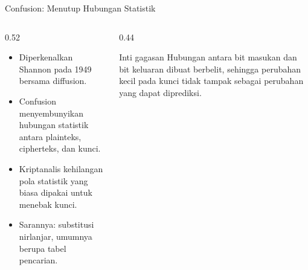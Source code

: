 \documentclass[aspectratio=169,11pt]{beamer}
\begin{document}
\begin{frame}{Confusion: Menutup Hubungan Statistik}
    \begin{columns}[T,onlytextwidth]
        \begin{column}{0.52\textwidth}
            \footnotesize
            \begin{itemize}
                \item Diperkenalkan Shannon pada 1949 bersama diffusion.
                \item Confusion menyembunyikan hubungan statistik antara
                      plainteks, cipherteks, dan kunci.
                \item Kriptanalis kehilangan pola statistik yang biasa
                      dipakai untuk menebak kunci.
                \item Sarannya: substitusi nirlanjar, umumnya berupa tabel
                      pencarian.
            \end{itemize}
        \end{column}
        \begin{column}{0.44\textwidth}
            \begin{block}{Inti gagasan}
                \footnotesize
                Hubungan antara bit masukan dan bit keluaran dibuat
                berbelit, sehingga perubahan kecil pada kunci tidak
                tampak sebagai perubahan yang dapat diprediksi.
            \end{block}
        \end{column}
    \end{columns}
\end{frame}
\end{document}
